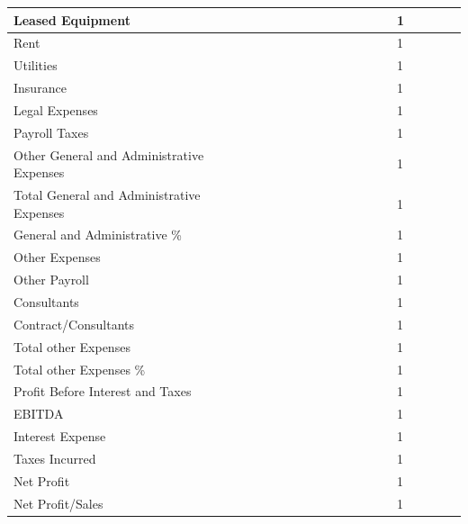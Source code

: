 \documentclass[11pt,titlepage]{article}
\begin{document}
\begin{landscape}
\begin{scriptsize}
\begin{tabular}{ | l | l | l | l | l | l | l | l | l | l | l | l | l | l | l | l | l | l |}
  Leased Equipment & & & & & & & & & & & & & 1\\\hline
  Rent & & & & & & & & & & & & & 1\\\hline
  Utilities & & & & & & & & & & & & & 1\\\hline
  Insurance & & & & & & & & & & & & & 1\\\hline
  Legal Expenses & & & & & & & & & & & & & 1\\\hline
  Payroll Taxes & & & & & & & & & & & & & 1\\\hline
  Other General and Administrative Expenses & & & & & & & & & & & & & 1\\\hline
  Total General and Administrative Expenses & & & & & & & & & & & & & 1\\\hline
  General and Administrative \% & & & & & & & & & & & & & 1\\\hline
  Other Expenses & & & & & & & & & & & & & 1\\\hline
  Other Payroll & & & & & & & & & & & & & 1\\\hline
  Consultants & & & & & & & & & & & & & 1\\\hline
  Contract/Consultants & & & & & & & & & & & & & 1\\\hline
  Total other Expenses & & & & & & & & & & & & & 1\\\hline
  Total other Expenses \% & & & & & & & & & & & & & 1\\\hline
  Profit Before Interest and Taxes & & & & & & & & & & & & & 1\\\hline
  EBITDA & & & & & & & & & & & & & 1\\\hline
  Interest Expense & & & & & & & & & & & & & 1\\\hline
  Taxes Incurred & & & & & & & & & & & & & 1\\\hline
  Net Profit & & & & & & & & & & & & & 1\\\hline
  Net Profit/Sales & & & & & & & & & & & & & 1\\\hline
\end{tabular}
\end{scriptsize}
\end{landscape}
\newpage
\thispagestyle{empty}
\end{document}
